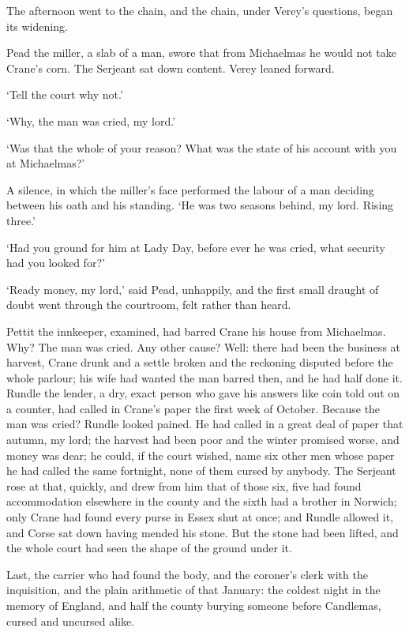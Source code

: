 \documentclass[11pt]{article}
\begin{document}
The afternoon went to the chain, and the chain, under Verey's questions, began its widening.

Pead the miller, a slab of a man, swore that from Michaelmas he would not take Crane's corn. The Serjeant sat down content. Verey leaned forward.

`Tell the court why not.'

`Why, the man was cried, my lord.'

`Was that the whole of your reason? What was the state of his account with you at Michaelmas?'

A silence, in which the miller's face performed the labour of a man deciding between his oath and his standing. `He was two seasons behind, my lord. Rising three.'

`Had you ground for him at Lady Day, before ever he was cried, what security had you looked for?'

`Ready money, my lord,' said Pead, unhappily, and the first small draught of doubt went through the courtroom, felt rather than heard.

Pettit the innkeeper, examined, had barred Crane his house from Michaelmas. Why? The man was cried. Any other cause? Well: there had been the business at harvest, Crane drunk and a settle broken and the reckoning disputed before the whole parlour; his wife had wanted the man barred then, and he had half done it. Rundle the lender, a dry, exact person who gave his answers like coin told out on a counter, had called in Crane's paper the first week of October. Because the man was cried? Rundle looked pained. He had called in a great deal of paper that autumn, my lord; the harvest had been poor and the winter promised worse, and money was dear; he could, if the court wished, name six other men whose paper he had called the same fortnight, none of them cursed by anybody. The Serjeant rose at that, quickly, and drew from him that of those six, five had found accommodation elsewhere in the county and the sixth had a brother in Norwich; only Crane had found every purse in Essex shut at once; and Rundle allowed it, and Corse sat down having mended his stone. But the stone had been lifted, and the whole court had seen the shape of the ground under it.

Last, the carrier who had found the body, and the coroner's clerk with the inquisition, and the plain arithmetic of that January: the coldest night in the memory of England, and half the county burying someone before Candlemas, cursed and uncursed alike.
\end{document}
